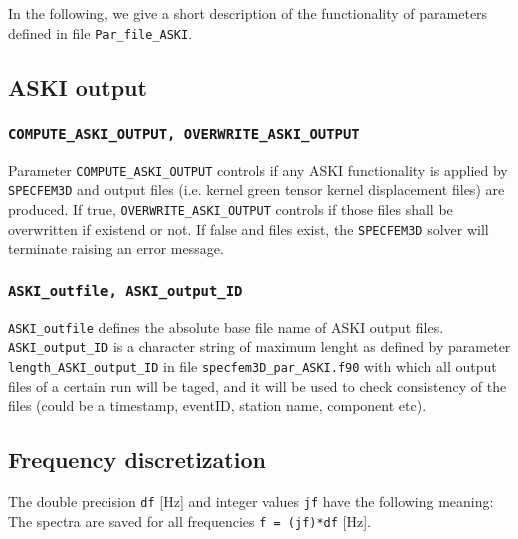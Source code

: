 \documentclass[12pt,a4paper]{article}
\newcommand{\lcode}[1]{\nolinkurl{#1}}
\newcommand{\lcodetitle}[1]{ {\ttfamily #1} }
\newcommand{\ASKI}{ {\ttfamily ASKI} }
\begin{document}
In the following, we give a short description of the functionality of parameters defined
in file \lcode{Par_file_ASKI}.
\subsection{\lcodetitle{ASKI} output} \label{Par_file_ASKI,sub:output}
\subsubsection*{\lcode{COMPUTE_ASKI_OUTPUT, OVERWRITE_ASKI_OUTPUT}}
Parameter \lcode{COMPUTE_ASKI_OUTPUT} controls if any ASKI functionality is applied by \lcode{SPECFEM3D} and
output files (i.e. kernel green tensor kernel displacement files) are produced. If true, \lcode{OVERWRITE_ASKI_OUTPUT}
controls if those files shall be overwritten if existend or not. If false and files exist, the \lcode{SPECFEM3D}
solver will terminate raising an error message.
\subsubsection*{\lcode{ASKI_outfile, ASKI_output_ID}}
\lcode{ASKI_outfile} defines the absolute base file name of \ASKI output files. \lcode{ASKI_output_ID} is a character
string of maximum lenght as defined by parameter \lcode{length_ASKI_output_ID} in file \lcode{specfem3D_par_ASKI.f90} 
with which all output files of a certain run will be taged, and it will be used to check consistency of the files
(could be a timestamp, eventID, station name, component etc).
\subsection{Frequency discretization}
The double precision \lcode{df} [Hz] and integer values \lcode{jf} have the following meaning:
The spectra are saved for all frequencies \lcode{f = (jf)*df} [Hz].
\end{document}
